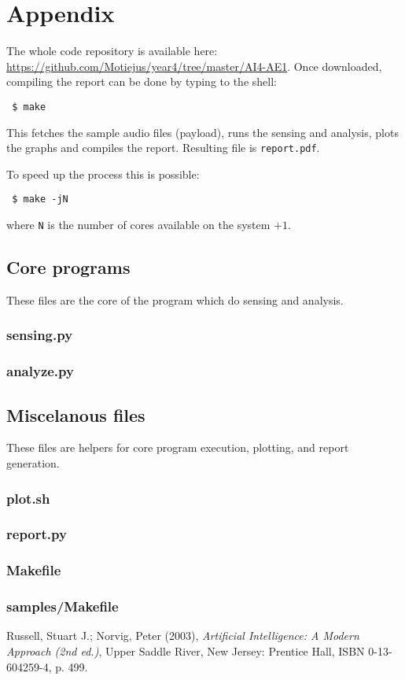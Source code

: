 \documentclass[english,11pt]{article}
\numberwithin{equation}{section}
\newcommand{\listing}[1]{
    \subsubsection{#1}
    \label{lst:#1}
    {\small }
}
\begin{document}
\section{Appendix}

The whole code repository is available here:
\url{https://github.com/Motiejus/year4/tree/master/AI4-AE1}. Once downloaded,
compiling the report can be done by typing to the shell:

\texttt {
   \$ make
}

This fetches the sample audio files (payload), runs the sensing and analysis,
plots the graphs and compiles the report. Resulting file is
\texttt{report.pdf}.

To speed up the process this is possible:

\texttt {
    \$ make -jN
}

where \texttt{N} is the number of cores available on the system $+1$.

\subsection{Core programs}
These files are the core of the program which do sensing and analysis.

\listing{sensing.py}
\listing{analyze.py}

\subsection{Miscelanous files}

These files are helpers for core program execution, plotting, and report
generation.

\listing{plot.sh}
\listing{report.py}
\listing{Makefile}
\listing{samples/Makefile}

\clearpage
\begin{thebibliography}{9}

        Russell, Stuart J.; Norvig, Peter (2003),
        \emph{Artificial Intelligence: A Modern Approach (2nd ed.)},
        Upper Saddle River, New Jersey: Prentice Hall,
        ISBN 0-13-604259-4, p. 499.

\end{thebibliography}
\end{document}

